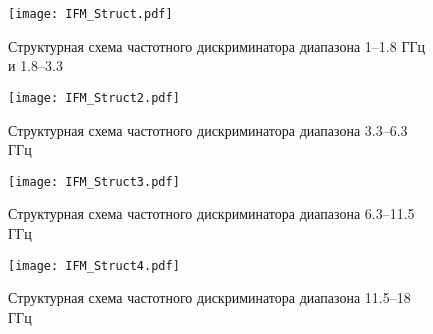 \begin{figure}[ht]
	\centering
	\texttt{[image: IFM\_Struct.pdf]}
	
	\caption{Структурная схема частотного дискриминатора диапазона \numrange{1}{1.8} ГГц и \numrange{1.8}{3.3}}
	\label{ct:freq_estimate_1g_1g8}
\end{figure}

\begin{figure}[ht]
	\centering
	\texttt{[image: IFM\_Struct2.pdf]}
	
	\caption{Структурная схема частотного дискриминатора диапазона \numrange{3.3}{6.3} ГГц}
	\label{ct:freq_estimate_3g3_6g3}
\end{figure}

\begin{figure}[ht]
	\centering
	\texttt{[image: IFM\_Struct3.pdf]}
	
	\caption{Структурная схема частотного дискриминатора диапазона \numrange{6.3}{11.5} ГГц}
	\label{ct:freq_estimate_6g3_12g}
\end{figure}

\begin{figure}[ht]
	\centering
	\texttt{[image: IFM\_Struct4.pdf]}
	
	\caption{Структурная схема частотного дискриминатора диапазона \numrange{11.5}{18} ГГц}
	\label{ct:freq_estimate_11g5_18g}
\end{figure}